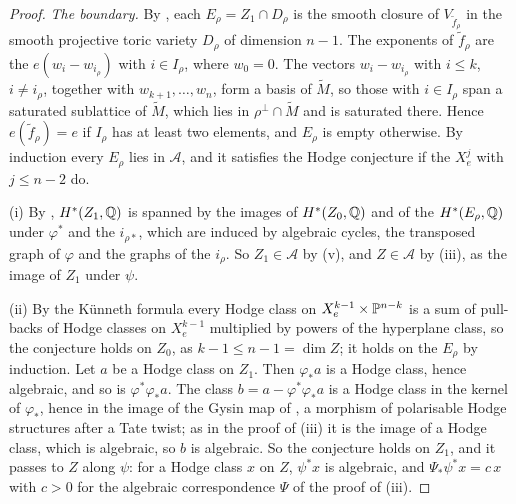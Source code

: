 \begin{proof}
\emph{The boundary.} By , each $E_{\rho}=Z_{1}\cap
D_{\rho}$ is the smooth closure of $V_{\widetilde f_{\rho}}$ in the smooth
projective toric variety $D_{\rho}$ of dimension $n-1$. The exponents of
$\widetilde f_{\rho}$ are the $e(w_{i}-w_{i_{\rho}})$ with $i\in I_{\rho}$,
where $w_{0}=0$. The vectors $w_{i}-w_{i_{\rho}}$ with $i\le k$,
$i\ne i_{\rho}$, together with $w_{k+1},\dots,w_{n}$, form a basis of
$\widetilde M$, so those with $i\in I_{\rho}$ span a saturated sublattice of
$\widetilde M$, which lies in $\rho^{\perp}\cap\widetilde M$ and is
saturated there. Hence $e(\widetilde f_{\rho})=e$ if $I_{\rho}$ has at least
two elements, and $E_{\rho}$ is empty otherwise. By induction every
$E_{\rho}$ lies in $\mathcal{A}$, and it satisfies the Hodge conjecture if
the $X^{j}_{e}$ with $j\le n-2$ do.

(i) By , $H^{*}(Z_{1},\mathbb{Q})$ is spanned by the images of
$H^{*}(Z_{0},\mathbb{Q})$ and of the $H^{*}(E_{\rho},\mathbb{Q})$ under $\varphi^{*}$ and
the $i_{\rho*}$, which are induced by algebraic cycles, the transposed
graph of $\varphi$ and the graphs of the $i_{\rho}$. So
$Z_{1}\in\mathcal{A}$ by (v), and $Z\in\mathcal{A}$ by
(iii), as the image of $Z_{1}$ under $\psi$.

(ii) By the K\"unneth formula every Hodge class on $X^{k-1}_{e}\times
\mathbb{P}^{n-k}$ is a sum of pull-backs of Hodge classes on $X^{k-1}_{e}$
multiplied by powers of the hyperplane class, so the conjecture holds on
$Z_{0}$, as $k-1\le n-1=\dim Z$; it holds on the $E_{\rho}$ by induction.
Let $a$ be a Hodge class on $Z_{1}$. Then $\varphi_{*}a$ is a Hodge class,
hence algebraic, and so is $\varphi^{*}\varphi_{*}a$. The class
$b=a-\varphi^{*}\varphi_{*}a$ is a Hodge class in the kernel of
$\varphi_{*}$, hence in the image of the Gysin map of
, a morphism of polarisable Hodge structures after a
Tate twist; as in the proof of (iii) it is the image of a
Hodge class, which is algebraic, so $b$ is algebraic. So the conjecture
holds on $Z_{1}$, and it passes to $Z$ along $\psi$: for a Hodge class $x$
on $Z$, $\psi^{*}x$ is algebraic, and $\Psi_{*}\psi^{*}x=c\,x$ with $c>0$ for
the algebraic correspondence $\Psi$ of the proof of
(iii).
\end{proof}

